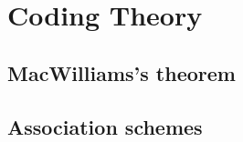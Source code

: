 \chapter{Coding Theory}
\label{ch:18}
\section{MacWilliams's theorem}
\label{sec:18-1}

\section{Association schemes}
\label{sec:18-2}

